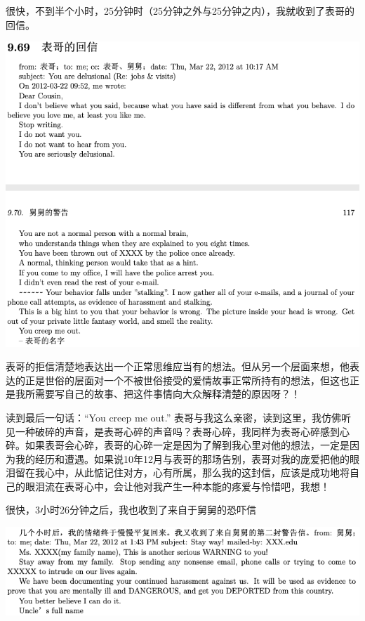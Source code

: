 \documentclass[9pt, b5paper]{article}
\begin{document}
很快，不到半个小时，25分钟时（25分钟之外与25分钟之内），我就收到了表哥的回信。

\begin{center}
\includegraphics[width=.9\linewidth]{./pic/p1p117.png}
\end{center}

表哥的拒信清楚地表达出一个正常思维应当有的想法。但从另一个层面来想，他表达的正是世俗的层面对一个不被世俗接受的爱情故事正常所持有的想法，但这也正是我所需要写自己的故事、把这件事情向大众解释清楚的原因呀？！

读到最后一句话：“You creep me out.” 表哥与我这么亲密，读到这里，我仿佛听见一种破碎的声音，是表哥心碎的声音吗？表哥心碎，我同样为表哥心碎感到心碎。如果表哥会心碎，表哥的心碎一定是因为了解到我心里对他的想法，一定是因为我的经历和遭遇。如果说10年12月与表哥的那场告别，表哥对我的庞爱把他的眼泪留在我心中，从此惦记住对方，心有所属，那么我的这封信，应该是成功地将自己的眼泪流在表哥心中，会让他对我产生一种本能的疼爱与怜惜吧，我想！

很快，3小时26分钟之后，我也收到了来自于舅舅的恐吓信

\begin{center}
\includegraphics[width=.9\linewidth]{./pic/p1p117-2.png}
\end{center}
\end{document}
